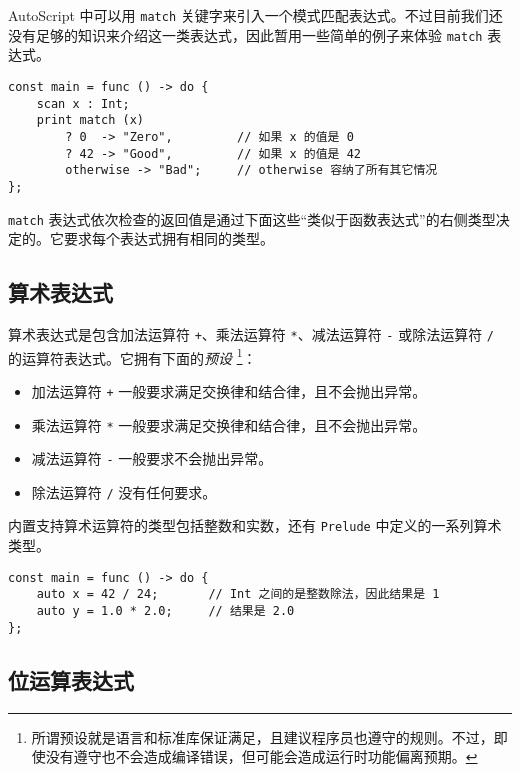 AutoScript 中可以用 \lstinline!match! 关键字来引入一个模式匹配表达式。不过目前我们还没有足够的知识来介绍这一类表达式，因此暂用一些简单的例子来体验 \lstinline!match! 表达式。

\begin{lstlisting}
const main = func () -> do {
    scan x : Int;
    print match (x)
        ? 0  -> "Zero",			// 如果 x 的值是 0
        ? 42 -> "Good",			// 如果 x 的值是 42
        otherwise -> "Bad";     // otherwise 容纳了所有其它情况
};
\end{lstlisting}

\lstinline!match! 表达式依次检查的返回值是通过下面这些“类似于函数表达式”的右侧类型决定的。它要求每个表达式拥有相同的类型。

\subsection{算术表达式}

算术表达式是包含加法运算符 \lstinline!+!、乘法运算符 \lstinline!*!、减法运算符 \lstinline!-! 或除法运算符 \lstinline!/! 的运算符表达式。它拥有下面的\emph{预设} \footnote{所谓预设就是语言和标准库保证满足，且建议程序员也遵守的规则。不过，即使没有遵守也不会造成编译错误，但可能会造成运行时功能偏离预期。}：

\begin{itemize}
    \item 加法运算符 \lstinline!+! 一般要求满足交换律和结合律，且不会抛出异常。

    \item 乘法运算符 \lstinline!*! 一般要求满足交换律和结合律，且不会抛出异常。

    \item 减法运算符 \lstinline!-! 一般要求不会抛出异常。

    \item 除法运算符 \lstinline!/! 没有任何要求。
\end{itemize}

内置支持算术运算符的类型包括整数和实数，还有 \lstinline!Prelude! 中定义的一系列算术类型。

\begin{lstlisting}
const main = func () -> do {
    auto x = 42 / 24;       // Int 之间的是整数除法，因此结果是 1
    auto y = 1.0 * 2.0;     // 结果是 2.0
};
\end{lstlisting}

\subsection{位运算表达式}


